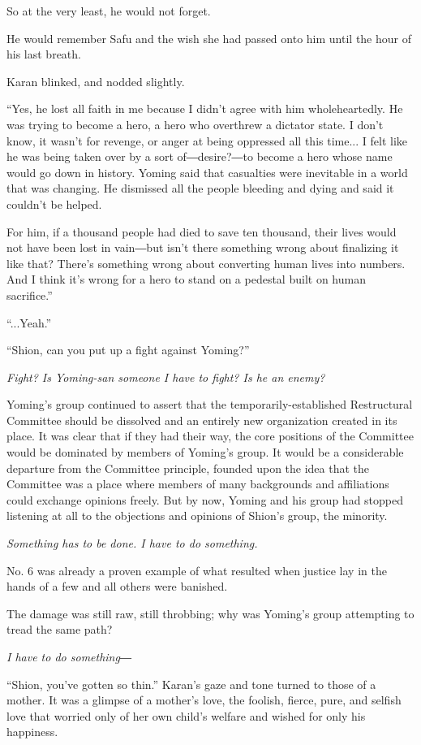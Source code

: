 So at the very least, he would not forget.

He would remember Safu and the wish she had passed onto him until the
hour of his last breath.

Karan blinked, and nodded slightly.

``Yes, he lost all faith in me because I didn't agree with him
wholeheartedly. He was trying to become a hero, a hero who overthrew a
dictator state. I don't know, it wasn't for revenge, or anger at being
oppressed all this time... I felt like he was being taken over by a sort
of―desire?―to become a hero whose name would go down in history. Yoming
said that casualties were inevitable in a world that was changing. He
dismissed all the people bleeding and dying and said it couldn't be
helped.~

For him, if a thousand people had died to save ten thousand, their lives
would not have been lost in vain―but isn't there something wrong about
finalizing it like that? There's something wrong about converting human
lives into numbers. And I think it's wrong for a hero to stand on a
pedestal built on human sacrifice.''

``...Yeah.''

``Shion, can you put up a fight against Yoming?''

\emph{Fight? Is Yoming-san someone I have to fight? Is he an enemy?}

Yoming's group continued to assert that the temporarily-established
Restructural Committee should be dissolved and an entirely new
organization created in its place. It was clear that if they had their
way, the core positions of the Committee would be dominated by members
of Yoming's group. It would be a considerable departure from the
Committee principle, founded upon the idea that the Committee was a
place where members of many backgrounds and affiliations could exchange
opinions freely. But by now, Yoming and his group had stopped listening
at all to the objections and opinions of Shion's group, the minority.

\emph{Something has to be done. I have to do something.}

No. 6 was already a proven example of what resulted when justice lay in
the hands of a few and all others were banished.~

The damage was still raw, still throbbing; why was Yoming's group
attempting to tread the same path?

\emph{I have to do something―}

``Shion, you've gotten so thin.'' Karan's gaze and tone turned to those
of a mother. It was a glimpse of a mother's love, the foolish, fierce,
pure, and selfish love that worried only of her own child's welfare and
wished for only his happiness.

